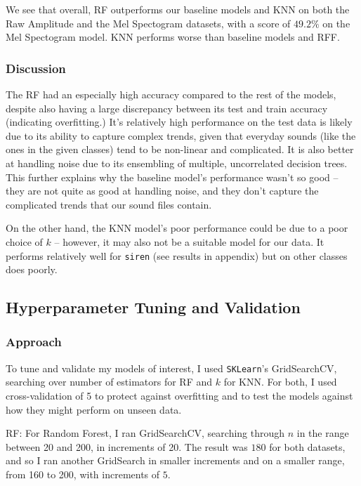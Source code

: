 \documentclass[11pt]{article}
\begin{document}
\noindent We see that overall, RF outperforms our baseline models and KNN on both the Raw Amplitude and the Mel Spectogram datasets, with a score of $49.2\%$ on the Mel Spectogram model. KNN performs worse than baseline models and RFF.

\subsubsection{Discussion}
The RF had an especially high accuracy compared to the rest of the models, despite also having a large discrepancy between its test and train accuracy (indicating overfitting.) It's relatively high performance on the test data is likely due to its ability to capture complex trends, given that everyday sounds (like the ones in the given classes) tend to be non-linear and complicated. It is also better at handling noise due to its ensembling of multiple, uncorrelated decision trees. This further explains why the baseline model's performance wasn't so good – they are not quite as good at handling noise, and they don't capture the complicated trends that our sound files contain.

On the other hand, the KNN model's poor performance could be due to a poor choice of $k$ -- however, it may also not be a suitable model for our data. It performs relatively well for \texttt{siren} (see results in appendix) but on other classes does poorly.

\subsection{Hyperparameter Tuning and Validation}

\subsubsection{Approach}

To tune and validate my models of interest, I used \texttt{SKLearn}'s GridSearchCV, searching over number of estimators for RF and $k$ for KNN. For both, I used cross-validation of 5 to protect against overfitting and to test the models against how they might perform on unseen data.

\noindent RF: For Random Forest, I ran GridSearchCV, searching through $n$ in the range between 20 and 200, in increments of 20. The result was $180$ for both datasets, and so I ran another GridSearch in smaller increments and on a smaller range, from 160 to 200, with increments of $5$. 
\end{document}
